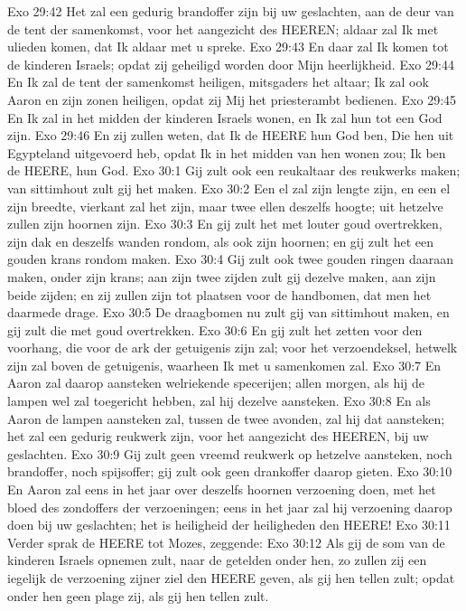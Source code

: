 Exo 29:42  Het zal een gedurig brandoffer zijn bij uw geslachten, aan de deur van de tent der samenkomst, voor het aangezicht des HEEREN; aldaar zal Ik met ulieden komen, dat Ik aldaar met u spreke.
Exo 29:43  En daar zal Ik komen tot de kinderen Israels; opdat zij geheiligd worden door Mijn heerlijkheid.
Exo 29:44  En Ik zal de tent der samenkomst heiligen, mitsgaders het altaar; Ik zal ook Aaron en zijn zonen heiligen, opdat zij Mij het priesterambt bedienen.
Exo 29:45  En Ik zal in het midden der kinderen Israels wonen, en Ik zal hun tot een God zijn.
Exo 29:46  En zij zullen weten, dat Ik de HEERE hun God ben, Die hen uit Egypteland uitgevoerd heb, opdat Ik in het midden van hen wonen zou; Ik ben de HEERE, hun God.
Exo 30:1  Gij zult ook een reukaltaar des reukwerks maken; van sittimhout zult gij het maken.
Exo 30:2  Een el zal zijn lengte zijn, en een el zijn breedte, vierkant zal het zijn, maar twee ellen deszelfs hoogte; uit hetzelve zullen zijn hoornen zijn.
Exo 30:3  En gij zult het met louter goud overtrekken, zijn dak en deszelfs wanden rondom, als ook zijn hoornen; en gij zult het een gouden krans rondom maken.
Exo 30:4  Gij zult ook twee gouden ringen daaraan maken, onder zijn krans; aan zijn twee zijden zult gij dezelve maken, aan zijn beide zijden; en zij zullen zijn tot plaatsen voor de handbomen, dat men het daarmede drage.
Exo 30:5  De draagbomen nu zult gij van sittimhout maken, en gij zult die met goud overtrekken.
Exo 30:6  En gij zult het zetten voor den voorhang, die voor de ark der getuigenis zijn zal; voor het verzoendeksel, hetwelk zijn zal boven de getuigenis, waarheen Ik met u samenkomen zal.
Exo 30:7  En Aaron zal daarop aansteken welriekende specerijen; allen morgen, als hij de lampen wel zal toegericht hebben, zal hij dezelve aansteken.
Exo 30:8  En als Aaron de lampen aansteken zal, tussen de twee avonden, zal hij dat aansteken; het zal een gedurig reukwerk zijn, voor het aangezicht des HEEREN, bij uw geslachten.
Exo 30:9  Gij zult geen vreemd reukwerk op hetzelve aansteken, noch brandoffer, noch spijsoffer; gij zult ook geen drankoffer daarop gieten.
Exo 30:10  En Aaron zal eens in het jaar over deszelfs hoornen verzoening doen, met het bloed des zondoffers der verzoeningen; eens in het jaar zal hij verzoening daarop doen bij uw geslachten; het is heiligheid der heiligheden den HEERE!
Exo 30:11  Verder sprak de HEERE tot Mozes, zeggende:
Exo 30:12  Als gij de som van de kinderen Israels opnemen zult, naar de getelden onder hen, zo zullen zij een iegelijk de verzoening zijner ziel den HEERE geven, als gij hen tellen zult; opdat onder hen geen plage zij, als gij hen tellen zult.
